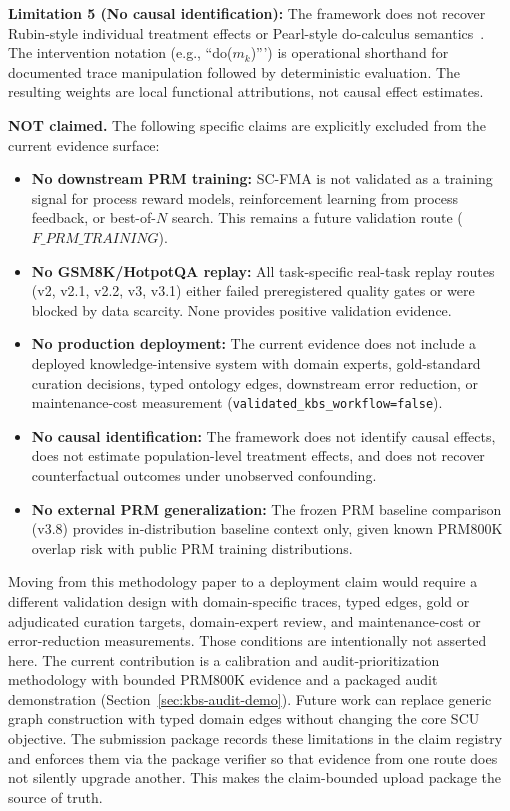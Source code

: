 \documentclass[a4paper,fleqn]{cas-sc}
\begin{document}
\textbf{Limitation 5 (No causal identification):} The framework does not recover Rubin-style individual treatment effects or Pearl-style do-calculus semantics~\cite{rubin1974estimating,pearl2009causality}. The intervention notation (e.g., ``do($m_k$)''') is operational shorthand for documented trace manipulation followed by deterministic evaluation. The resulting weights are local functional attributions, not causal effect estimates.

\medskip
\noindent\textbf{NOT claimed.} The following specific claims are explicitly excluded from the current evidence surface:
\begin{itemize}
  \item \textbf{No downstream PRM training:} SC-FMA is not validated as a training signal for process reward models, reinforcement learning from process feedback, or best-of-$N$ search. This remains a future validation route ($F\_PRM\_TRAINING$).
  \item \textbf{No GSM8K/HotpotQA replay:} All task-specific real-task replay routes (v2, v2.1, v2.2, v3, v3.1) either failed preregistered quality gates or were blocked by data scarcity. None provides positive validation evidence.
  \item \textbf{No production deployment:} The current evidence does not include a deployed knowledge-intensive system with domain experts, gold-standard curation decisions, typed ontology edges, downstream error reduction, or maintenance-cost measurement (\texttt{validated\_kbs\_workflow=false}).
  \item \textbf{No causal identification:} The framework does not identify causal effects, does not estimate population-level treatment effects, and does not recover counterfactual outcomes under unobserved confounding.
  \item \textbf{No external PRM generalization:} The frozen PRM baseline comparison (v3.8) provides in-distribution baseline context only, given known PRM800K overlap risk with public PRM training distributions.
\end{itemize}

Moving from this methodology paper to a deployment claim would require a different validation design with domain-specific traces, typed edges, gold or adjudicated curation targets, domain-expert review, and maintenance-cost or error-reduction measurements. Those conditions are intentionally not asserted here. The current contribution is a calibration and audit-prioritization methodology with bounded PRM800K evidence and a packaged audit demonstration (Section~\ref{sec:kbs-audit-demo}). Future work can replace generic graph construction with typed domain edges without changing the core SCU objective. The submission package records these limitations in the claim registry and enforces them via the package verifier so that evidence from one route does not silently upgrade another. This makes the claim-bounded upload package the source of truth.
\end{document}
